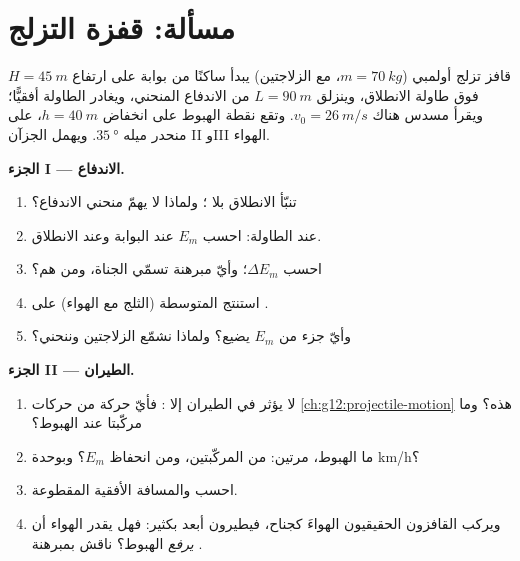 \section{مسألة: قفزة التزلج}

\begin{problem}
\label{pb:g12:work-and-energy:1}
قافز تزلج أولمبي ($m = \qty{70}{kg}$، مع الزلاجتين) يبدأ
ساكنًا من بوابة على ارتفاع $H = \qty{45}{m}$ فوق طاولة الانطلاق، وينزلق
$L = \qty{90}{m}$ من  الاندفاع المنحني، ويغادر الطاولة أفقيًّا؛
ويقرأ مسدس  هناك $v_0 = \qty{26}{m/s}$. وتقع نقطة الهبوط على انخفاض
$h = \qty{40}{m}$، على منحدر ميله $\qty{35}{\degree}$. ويهمل الجزآن II
وIII  الهواء.

\medskip\noindent\textbf{الجزء I ---  الاندفاع.}
\begin{enumerate}
  \item تنبّأ  الانطلاق بلا ؛ ولماذا لا يهمّ منحني
         الاندفاع؟
  \item {} عند الطاولة: احسب $E_m$ عند البوابة وعند الانطلاق.
  \item احسب $\Delta E_m$؛ وأيّ مبرهنة تسمّي الجناة، ومن هم؟
  \item استنتج   المتوسطة (الثلج مع الهواء) على .
  \item وأيّ جزء من $E_m$ يضيع؟ ولماذا نشمّع الزلاجتين وننحني؟
\end{enumerate}

\medskip\noindent\textbf{الجزء II --- الطيران.}
\begin{enumerate}[resume]
  \item لا يؤثر في الطيران إلا : فأيّ حركة من حركات
        \cref{ch:g12:projectile-motion} هذه؟ وما مركّبتا 
        عند الهبوط؟
  \item ما  الهبوط، مرتين: من المركّبتين، ومن انحفاظ
        $E_m$؟ وبوحدة \unit{km/h}؟
  \item احسب  والمسافة الأفقية المقطوعة.
  \item ويركب القافزون الحقيقيون الهواءَ كجناح، فيطيرون أبعد بكثير:
        فهل يقدر الهواء أن \emph{يرفع}  الهبوط؟ ناقش
        بمبرهنة .
\end{enumerate}


\end{problem}
